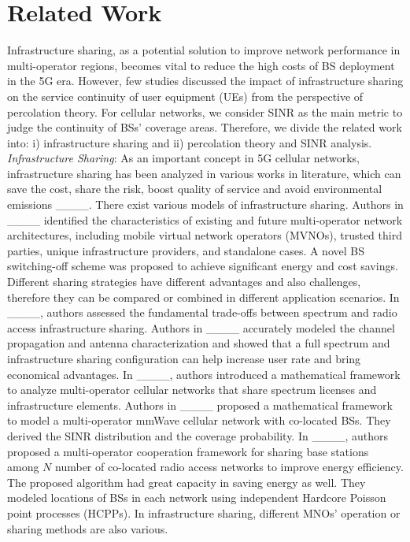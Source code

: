 \section{Related Work}
Infrastructure sharing, as a potential solution to improve network performance in multi-operator regions, becomes vital to reduce the high costs of BS deployment in the 5G era. However, few studies discussed the impact of infrastructure sharing on the service continuity of user equipment (UEs) from the perspective of percolation theory. For cellular networks, we consider SINR as the main metric to judge the continuity of BSs' coverage areas. Therefore, we divide the related work into: i) infrastructure sharing and ii) percolation theory and SINR analysis. \\
\indent \textit{Infrastructure Sharing}: As an important concept in 5G cellular networks, infrastructure sharing has been analyzed in various works in literature, which can save the cost, share the risk, boost quality of service and avoid environmental emissions ____. There exist various models of infrastructure sharing. Authors in ____ identified the characteristics of existing and future multi-operator network architectures, including mobile virtual network operators (MVNOs), trusted third parties, unique infrastructure providers, and standalone cases. A novel BS switching-off scheme was proposed to achieve significant energy and cost savings. Different sharing strategies have different advantages and also challenges, therefore they can be compared or combined in different application scenarios. 
In ____, authors assessed the fundamental trade-offs between spectrum and radio access infrastructure sharing. 
Authors in ____ accurately modeled the channel propagation and antenna characterization and showed that a full spectrum and infrastructure sharing configuration can help increase user rate and bring economical advantages. 
In ____, authors introduced a mathematical framework to analyze multi-operator cellular networks that share spectrum licenses and infrastructure elements. Authors in ____ proposed a mathematical framework to model a multi-operator mmWave cellular network with co-located BSs. They derived the SINR distribution and the coverage probability. 
In ____, authors proposed a multi-operator cooperation framework for sharing base stations among $N$ number of co-located radio access networks to improve energy efficiency. 
The proposed algorithm had great capacity in saving energy as well. They modeled locations of BSs in each network using independent Hardcore Poisson point processes (HCPPs). In infrastructure sharing, different MNOs' operation or sharing methods are also various.
